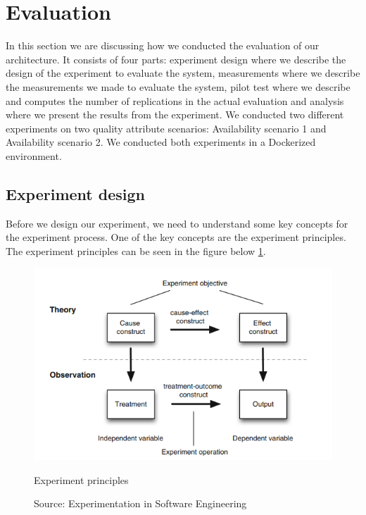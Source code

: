 \section{Evaluation}
\label{sec:evaluation}

In this section we are discussing how we conducted the evaluation of our architecture. It consists of four parts: experiment design where we describe the design of the experiment to evaluate the system, measurements where we describe the measurements we made to evaluate the system, pilot test where we describe and computes the number of replications in the actual evaluation and analysis where we present the results from the experiment. We conducted two different experiments on two quality attribute scenarios: Availability scenario 1 and Availability scenario 2. We conducted both experiments in a Dockerized environment.

\subsection{Experiment design}
\label{sec:design}
Before we design our experiment, we need to understand some key concepts for the experiment process. One of the key concepts are the experiment principles. The experiment principles can be seen in the figure below \ref{fig:experiment_principles}.

\begin{figure}[ht]
\centering
  \includegraphics[width=\linewidth]{images/experiment_principles.png}
  \caption{Experiment principles}
  \caption*{Source: Experimentation in Software Engineering}
  \cite{experimentationInSoftwareEngineering}
  \label{fig:experiment_principles}
\end{figure}

